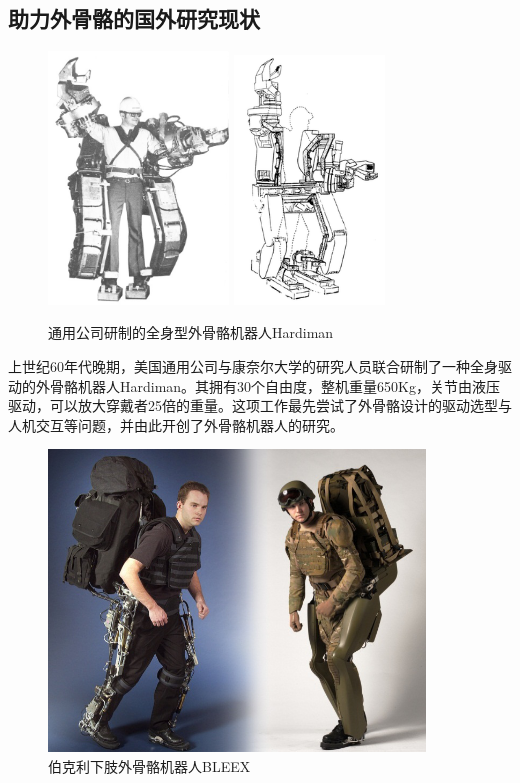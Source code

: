 \subsection{助力外骨骼的国外研究现状}
\begin{figure}[!h]
    \label{fig:sub1}{\includegraphics[width=4.8cm]{fig/f3_Hardiman.jpg}}\quad
    \label{fig:sub2}{\includegraphics[width=4cm]{fig/f4_Hardiman.jpg}}
    \caption{通用公司研制的全身型外骨骼机器人Hardiman\cite{p6}}
    \label{fig:subfigs}
\end{figure}

上世纪60年代晚期，美国通用公司与康奈尔大学的研究人员联合研制了一种全身驱动的外骨骼机器人Hardiman\cite{p6}。其拥有30个自由度，整机重量650Kg，关节由液压驱动，可以放大穿戴者25倍的重量。这项工作最先尝试了外骨骼设计的驱动选型与人机交互等问题，并由此开创了外骨骼机器人的研究。
\begin{figure}[htb]
    \includegraphics[width=10cm]{fig/f5_BLEEX.jpg}
    \caption{伯克利下肢外骨骼机器人BLEEX\cite{p5,p7}}
    \label{fig:mark}
\end{figure}

